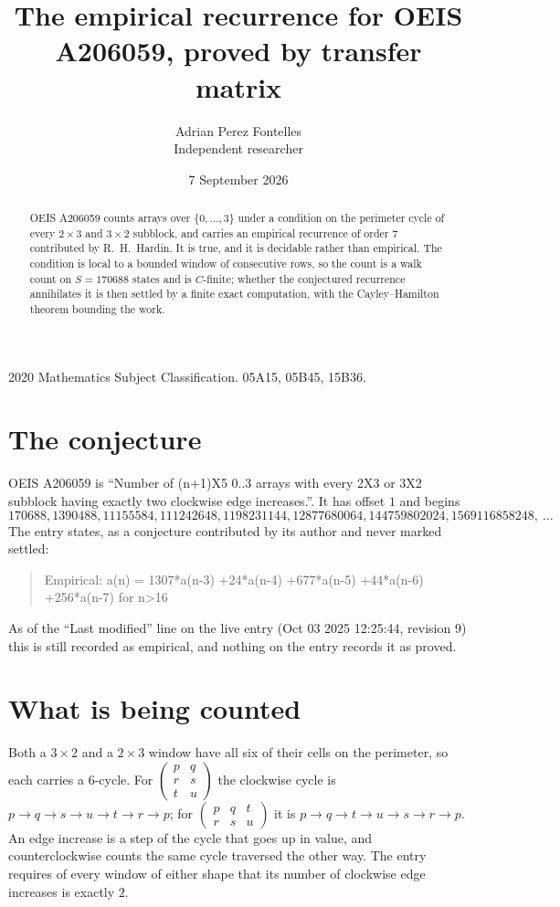 \documentclass[11pt,a4paper]{article}
\title{The empirical recurrence for OEIS A206059, proved by transfer matrix}
\author{Adrian Perez Fontelles\\ \small Independent researcher}
\date{7 September 2026}
\theoremstyle{plain}
\theoremstyle{definition}
\begin{document}
\maketitle

\begin{abstract}
OEIS A206059 counts arrays over $\{0,\dots,3\}$ under a condition on the perimeter cycle of
every $2\times3$ and $3\times2$ subblock, and carries an empirical recurrence of order $7$ contributed by
R.~H.~Hardin. It is true, and it is decidable rather than empirical. The condition is local to
a bounded window of consecutive rows, so the count is a walk count on $S=170688$ states and is
$C$-finite; whether the conjectured recurrence annihilates it is then settled by a finite exact
computation, with the Cayley--Hamilton theorem bounding the work.
\end{abstract}

\noindent\small 2020 Mathematics Subject Classification. 05A15, 05B45, 15B36.\normalsize

\section{The conjecture}

OEIS A206059 is ``Number of (n+1)X5 0..3 arrays with every 2X3 or 3X2 subblock having exactly two clockwise edge increases.''. It has offset $1$ and begins
\[
170688, 1390488, 11155584, 111242648, 1198231144, 12877680064, 144759802024, 1569116858248,\ \dots
\]
The entry states, as a conjecture contributed by its author and never marked settled:
\begin{quote}
Empirical: a(n) = 1307*a(n-3) +24*a(n-4) +677*a(n-5) +44*a(n-6) +256*a(n-7) for n>16
\end{quote}
As of the ``Last modified'' line on the live entry (Oct 03 2025 12:25:44, revision 9) this is still
recorded as empirical, and nothing on the entry records it as proved.

\section{What is being counted}

Both a $3\times2$ and a $2\times3$ window have all six of their cells on the
perimeter, so each carries a $6$-cycle. For
$\begin{pmatrix}p&q\\r&s\\t&u\end{pmatrix}$ the clockwise cycle is
$p\to q\to s\to u\to t\to r\to p$; for
$\begin{pmatrix}p&q&t\\r&s&u\end{pmatrix}$ it is
$p\to q\to t\to u\to s\to r\to p$. An edge increase is a step of the cycle that goes up in
value, and counterclockwise counts the same cycle traversed the other way. The entry requires
of every window of either shape that its number of clockwise edge increases is exactly $2$.
\end{document}
